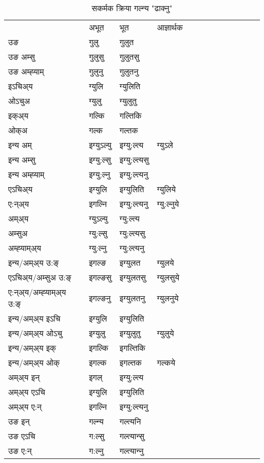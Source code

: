 \begin{table}[H]
\centering
\caption{\label{ul.vt} सकर्मक क्रिया  गल्न्य  "ढाक्नु"  }
\begin{tabular}{l|l|l|l|l|l|l|l|l|l|l|l|l}  \toprule
&अभूत & भूत & आज्ञार्थक \\ 
उङ &गुलु &गुलुत \\ 
उङ अम्सु &गुलुसु &गुलुतसु \\ 
उङ अम्ह्‍याम् &गुलुनु &गुलुतनु \\ 
इऽचिअ्य &ग्युलि &ग्युलिति   \\ 
ओऽचुअ &ग्युलु &ग्युलुतु   \\ 
इक्अ्य &गल्कि &गल्तिकि   \\ 
ओक्अ &गल्क &गल्तक   \\ 
इन्य अम् & इग्युऽल्यु  & इग्यु:ल्त्य &ग्युऽले  \\ 
इन्य अम्सु & इग्यु:ल्सु  & इग्यु:ल्त्यसु   \\ 
इन्य अम्ह्‍याम् & इग्यु:ल्नु  & इग्यु:ल्त्यनु   \\ 
एऽचिअ्य & इग्युलि & इग्युलिति &ग्युलिये    \\ 
ए:न्अ्य & इगल्नि  & इग्यु:ल्त्यनु &ग्यु:ल्नुये  \\ 
अम्अ्य & ग्युऽल्यु  & ग्यु:ल्त्य  \\ 
अम्सुअ & ग्यु:ल्सु & ग्यु:ल्त्यसु  \\ 
अम्ह्‍याम्अ्य & ग्यु:ल्नु  & ग्यु:ल्त्यनु \\ 
\midrule
इन्य/अम्अ्य उ:ङ्‌&इगल्ङ & इग्युलत &ग्युलये \\ 
एऽचिअ्य/अम्सुअ उ:ङ्‌ &इगल्ङसु & इग्युलतसु &ग्युलसुये \\ 
ए:न्अ्य/अम्ह्‍याम्अ्य उ:ङ्‌ &इगल्ङनु & इग्युलतनु &ग्युलनुये \\ 
इन्य/अम्अ्य इऽचि & इग्युलि & इग्युलिति    \\ 
इन्य/अम्अ्य ओऽचु & इग्युलु & इग्युलुतु  &ग्युलुये  \\ 
इन्य/अम्अ्य इक् & इगल्कि & इगल्तिकि   \\ 
इन्य/अम्अ्य ओक् & इगल्क & इगल्तक  &गल्कये  \\ 
अम्अ्य इन् & इगल् & इग्यु:ल्त्य   \\ 
अम्अ्य एऽचि & इग्युलि & इग्युलिति    \\ 
अम्अ्य ए:न् & इगल्नि  & इग्यु:ल्त्यनु  \\ 
\midrule
उङ इन् & गल्न्य  & गल्त्यनि  \\ 
उङ एऽचि & ग:ल्सु  & गल्त्यान्सु   \\ 
उङ ए:न्& ग:ल्नु  & गल्त्यान्‍नु   \\ 
\bottomrule
\end{tabular}
\end{table}


